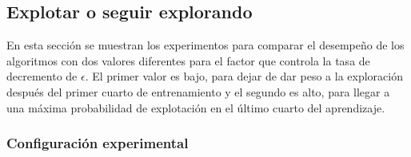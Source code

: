 


\newpage

\subsection{Explotar o seguir explorando}\label{subsection:exp-epsilon}

En esta sección se muestran los experimentos para comparar
el desempeño de los algoritmos con dos valores diferentes para
el factor que controla la tasa de decremento de $\epsilon$. El primer valor 
es bajo, para dejar de dar peso a la exploración después del primer
cuarto de entrenamiento y el segundo es alto, para llegar a una máxima probabilidad
de explotación en el último cuarto del aprendizaje.

\subsubsection{Configuración experimental}

